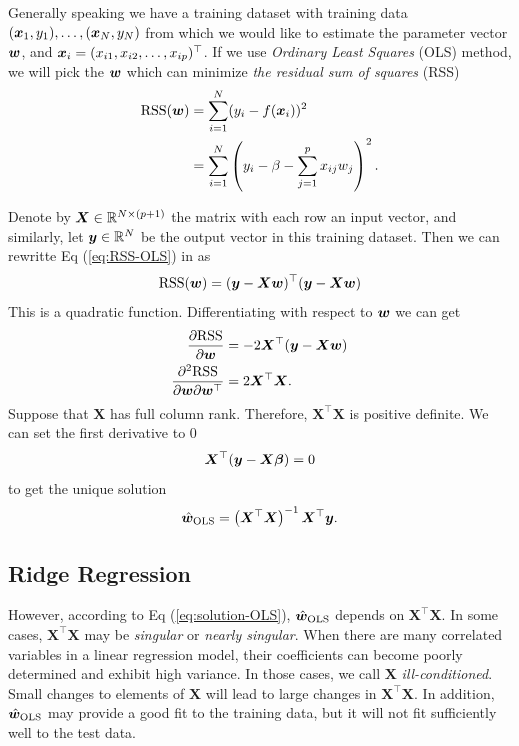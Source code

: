 Generally speaking we have a training dataset with training data \((\bm{x}_1, y_1), \dots, 
(\bm{x}_N, y_N)\) from which we would like to estimate the parameter vector \(\bm{w}\), and
\(\bm{x}_i = (x_{i1}, x_{i2}, \dots, x_{ip})^\top\).
If we use \emph{Ordinary Least Squares} (OLS) method, we will pick the \(\bm{w}\) which can
minimize \emph{the residual sum of squares} (RSS)
\begin{equation}\label{eq:RSS-OLS}
    \begin{aligned}
        \mathrm{RSS} (\bm{w}) &= \sum_{i=1}^N (y_i - f(\bm{x}_i))^2 \\
        &= \sum_{i=1}^N \left( y_i - \beta - \sum_{j=1}^p x_{ij}w_j \right)^2.
    \end{aligned}
\end{equation}

Denote by \(\bm{X} \in \mathbb{R}^{N \times (p + 1)}\) the matrix with each row an input vector, and similarly, let 
\(\bm{y} \in \mathbb{R}^N\) be the output vector in this training dataset. Then we can rewritte Eq (\ref{eq:RSS-OLS}) in
as
\begin{equation}\label{eq:RSS-OLS-mat}
    \mathrm{RSS}(\bm{w}) = (\bm{y} - \bm{Xw})^\top(\bm{y} - \bm{Xw}) 
\end{equation}
This is a quadratic function. Differentiating with respect to \(\bm{w}\) we can get 
\begin{equation}
    \begin{aligned}
        \pdv{\mathrm{RSS}}{\bm{w}} &= -2 \bm{X}^\top (\bm{y} - \bm{Xw}) \\
        \pdv{\mathrm{RSS}}{\bm{w}}{\bm{w}^\top} &= 2\bm{X}^\top \bm{X}.
    \end{aligned}
\end{equation}
Suppose that \(\bm{X}\) has full column rank. Therefore, \(\bm{X}^\top\bm{X}\) is positive definite.
We can set the first derivative to \(0\)
\begin{equation}
    \bm{X}^\top (\bm{y} - \bm{X\beta}) = 0
\end{equation}
to get the unique solution
\begin{equation}\label{eq:solution-OLS}
    \hat{\bm{w}}_{\text{OLS}} = \left(\bm{X}^\top \bm{X}\right)^{-1} \bm{X}^\top \bm{y}.
\end{equation}

\subsection{Ridge Regression}
However, according to Eq (\ref{eq:solution-OLS}), \(\hat{\bm{w}}_{\text{OLS}}\) depends on \(\bm{X}^\top\bm{X}\). 
In some cases, \(\bm{X}^\top\bm{X}\) may be \emph{singular} or \emph{nearly singular}. 
When there are many correlated variables in a linear regression model, their coefficients can become poorly determined and
exhibit high variance. In those cases, we call \(\bm{X}\) \emph{ill-conditioned}.
Small changes to elements of \(\bm{X}\) will lead to large changes in \(\bm{X}^\top\bm{X}\). In addition, \(\hat{\bm{w}}_{\text{OLS}}\) may provide a 
good fit to the training data, but it will not fit sufficiently well to the test data.

